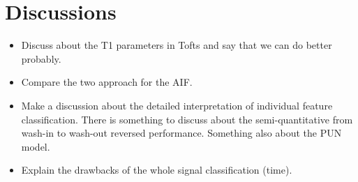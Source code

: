 \section{Discussions}\label{sec:discussions}

\begin{itemize}
  \item Discuss about the T1 parameters in Tofts and say that we can do better probably.
  \item Compare the two approach for the AIF.
  \item Make a discussion about the detailed interpretation of individual feature classification. There is something to discuss about the semi-quantitative from wash-in to wash-out reversed performance. Something also about the PUN model.
  \item Explain the drawbacks of the whole signal classification (time).
\end{itemize}

